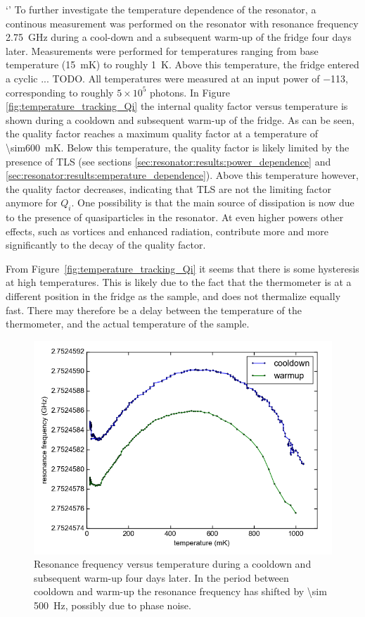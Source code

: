 \documentclass[12pt]{report}
\begin{document}
`'
To further investigate the temperature dependence of the resonator, a continous measurement was performed on the resonator with resonance frequency \SI{2.75}{\giga \hertz} during a cool-down and a subsequent warm-up of the fridge four days later. Measurements were performed for temperatures ranging from base temperature (\SI{15}{\milli \kelvin}) to roughly \SI{1}{\kelvin}. Above this temperature, the fridge entered a cyclic ... TODO. All temperatures were measured at an input power of \SI{-113}{\dBm}, corresponding to roughly $5 \times 10^5$ photons. In Figure \ref{fig:temperature_tracking_Qi} the internal quality factor versus temperature is shown during a cooldown and subsequent warm-up of the fridge. As can be seen, the quality factor reaches a maximum quality factor at a temperature of \SI{\sim600}{\milli \kelvin}. Below this temperature, the quality factor is likely limited by the presence of TLS (see sections \ref{sec:resonator:results:power_dependence} and \ref{sec:resonator:results:emperature_dependence}). Above this temperature however, the quality factor decreases, indicating that TLS are not the limiting factor anymore for $Q_i$. One possibility is that the main source of dissipation is now due to the presence of quasiparticles in the resonator. At even higher powers other effects, such as vortices and enhanced radiation, contribute more and more significantly to the decay of the quality factor.

From Figure~\ref{fig:temperature_tracking_Qi} it seems that there is some hysteresis at high temperatures. This is likely due to the fact that the thermometer is at a different position in the fridge as the sample, and does not thermalize equally fast. There may therefore be a delay between the temperature of the thermometer, and the actual temperature of the sample.


\begin{figure}[h]
    \centering
    \includegraphics[width=.7\textwidth]{Figures/Temperature tracking - f0 vs T.png}
    \caption{Resonance frequency versus temperature during a cooldown and subsequent warm-up four days later. In the period between cooldown and warm-up the resonance frequency has shifted by \SI{\sim 500}{\hertz}, possibly due to phase noise.}
    \label{fig:temperature_tracking_f0}
\end{figure}
\end{document}
